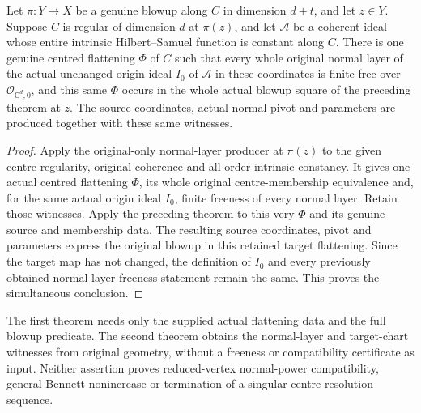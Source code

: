 \begin{theorem}
\label{hir:actual-original-free-normal-layers-fixed-blowup-coordinates}
\leanok
Let $\pi:Y\to X$ be a genuine blowup along $C$ in dimension
$d+t$, and let $z\in Y$. Suppose $C$ is regular of dimension $d$
at $\pi(z)$, and let $\mathcal A$ be a coherent ideal whose entire
intrinsic Hilbert--Samuel function is constant along $C$.
There is one genuine centred flattening $\Phi$ of $C$ such that
every whole original normal layer of the actual unchanged origin
ideal $I_0$ of $\mathcal A$ in these coordinates is finite free
over $\mathcal O_{\mathbb C^d,0}$, and this same $\Phi$ occurs in
the whole actual blowup square of the preceding theorem at $z$.
The source coordinates, actual normal pivot and parameters are
produced together with these same witnesses.
\end{theorem}
\begin{proof}
Apply the original-only normal-layer producer at $\pi(z)$ to
the given centre regularity, original coherence and all-order
intrinsic constancy. It gives one actual centred flattening
$\Phi$, its whole original centre-membership equivalence and,
for the same actual origin ideal $I_0$, finite freeness of every
normal layer. Retain those witnesses. Apply the preceding theorem
to this very $\Phi$ and its genuine source and membership data.
The resulting source coordinates, pivot and parameters express
the original blowup in this retained target flattening. Since
the target map has not changed, the definition of $I_0$ and every
previously obtained normal-layer freeness statement remain the
same. This proves the simultaneous conclusion.
\end{proof}

\begin{remark}
The first theorem needs only the supplied actual flattening data
and the full blowup predicate. The second theorem obtains the
normal-layer and target-chart witnesses from original geometry,
without a freeness or compatibility certificate as input.
Neither assertion proves reduced-vertex normal-power compatibility,
general Bennett nonincrease or termination of a singular-centre
resolution sequence.
\end{remark}
